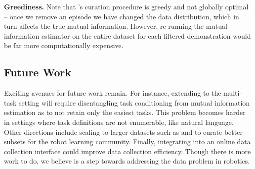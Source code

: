 \noindent \textbf{Greediness.} Note that \abv's curation procedure is greedy and not globally optimal -- once we remove an episode we have changed the data distribution, which in turn affects the true mutual information. However, re-running the mutual information estimator on the entire dataset for each filtered demonstration would be far more computationally expensive.

\subsection{Future Work}
Exciting avenues for future work remain. For instance, extending \abv to the multi-task setting will require disentangling task conditioning from mutual information estimation as to not retain only the easiest tasks. This problem becomes harder in settings where task definitions are not enumerable, like natural language. Other directions include scaling \abv to larger datasets such as \citet{openx} and \citet{droid} to curate better subsets for the robot learning community. Finally, integrating \abv into an online data collection interface could improve data collection efficiency. Though there is more work to do, we believe \abv is a step towards addressing the data problem in robotics. 

